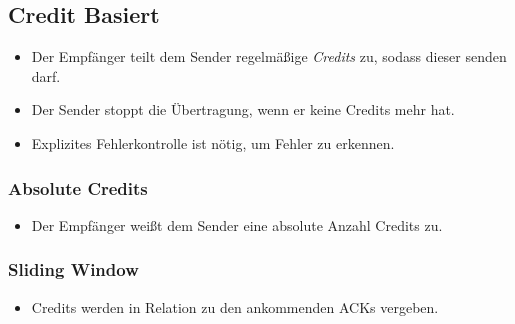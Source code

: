         \subsection{Credit Basiert}
            \begin{itemize}
            	\item Der Empfänger teilt dem Sender regelmäßige \textit{Credits} zu, sodass dieser senden darf.
            	\item Der Sender stoppt die Übertragung, wenn er keine Credits mehr hat.
            	\item Explizites Fehlerkontrolle ist nötig, um Fehler zu erkennen.
            \end{itemize}
            
            \subsubsection{Absolute Credits}
                \begin{itemize}
                	\item Der Empfänger weißt dem Sender eine absolute Anzahl Credits zu.
                \end{itemize}

            \subsubsection{Sliding Window}
                \begin{itemize}
                	\item Credits werden in Relation zu den ankommenden ACKs vergeben.
                \end{itemize}

